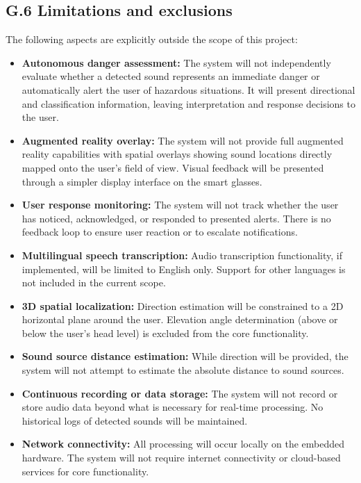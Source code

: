 \documentclass[12pt]{article}
\theoremstyle{definition}
\begin{document}
\subsection{G.6 Limitations and exclusions}

The following aspects are explicitly outside the scope of this project:

\begin{itemize}
\item \textbf{Autonomous danger assessment:} The system will not independently
evaluate whether a detected sound represents an immediate danger or
automatically alert the user of hazardous situations. It will present
directional and classification information, leaving interpretation and
response decisions to the user.

\item \textbf{Augmented reality overlay:} The system will not provide
full augmented reality capabilities with spatial overlays showing sound
locations directly mapped onto the user's field of view. Visual feedback
will be presented through a simpler display interface on the smart glasses.

\item \textbf{User response monitoring:} The system will not track whether
the user has noticed, acknowledged, or responded to presented alerts. There
is no feedback loop to ensure user reaction or to escalate notifications.

\item \textbf{Multilingual speech transcription:} Audio transcription
functionality, if implemented, will be limited to English only. Support
for other languages is not included in the current scope.

\item \textbf{3D spatial localization:} Direction estimation will be
constrained to a 2D horizontal plane around the user. Elevation angle
determination (above or below the user's head level) is excluded from
the core functionality.

\item \textbf{Sound source distance estimation:} While direction will be
provided, the system will not attempt to estimate the absolute distance
to sound sources.

\item \textbf{Continuous recording or data storage:} The system will not
record or store audio data beyond what is necessary for real-time processing.
No historical logs of detected sounds will be maintained.

\item \textbf{Network connectivity:} All processing will
occur locally on the embedded hardware. The system will not require internet
connectivity or cloud-based services for core functionality.
\end{itemize}
\end{document}
